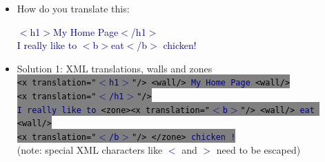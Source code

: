 \documentclass[landscape]{uedslides2C}
\newcommand{\example}[1]{\textcolor{darkblue}{\rm #1}}
\newcommand{\littlecode}[1]{\colorbox{gray}{\textcolor{black}{\small \tt #1}}}
\begin{document}

\begin{itemize}
\item How do you translate this:
\begin{center}
\example{$<$h1$>$My Home Page$<$/h1$>$\\
I really like to $<$b$>$eat$<$/b$>$ chicken!}
\end{center}
\item Solution 1: XML translations, walls and zones\\[5mm]
\littlecode{<x translation="\example{$<$h1$>$}"/> <wall/> \example{My Home Page} <wall/>}\\[-2mm]
\littlecode{<x translation="\example{$<$/h1$>$}"/>}\\[2mm]
\littlecode{\example{I really like to} <zone><x translation="\example{$<$b$>$}"/> <wall/> \example{eat} <wall/>}\\[-2mm]
\littlecode{<x translation="\example{$<$/b$>$}"/> </zone> \example{chicken !}}\\[5mm]
(note: special XML characters like \example{$<$} and \example{$>$} need to be escaped)
\end{itemize}

\end{document}
